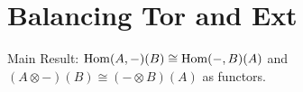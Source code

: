 \section{Balancing Tor and Ext}
Main Result: $\operatorname{\operatorname{Hom}}(A,-)(B)\cong\operatorname{\operatorname{Hom}}(-,B)(A)$ and $(A\otimes-)(B)\cong(-\otimes B)(A)$ as functors.







\newpage